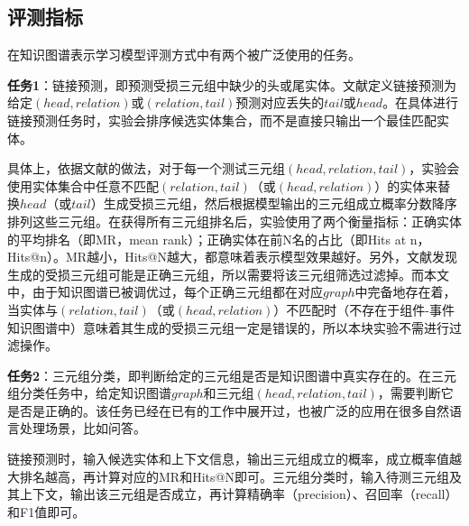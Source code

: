 \subsection{评测指标}
在知识图谱表示学习模型评测方式中有两个被广泛使用的任务。

\textbf{任务1}：链接预测，即预测受损三元组中缺少的头或尾实体。文献\parencite{bordes2011learning,bordes2013translatingE}定义链接预测为给定$(head,relation)$或$(relation,tail)$预测对应丢失的$tail$或$head$。在具体进行链接预测任务时，实验会排序候选实体集合，而不是直接只输出一个最佳匹配实体。

具体上，依据文献\parencite{bordes2013translatingE}的做法，对于每一个测试三元组$(head,relation,tail)$，实验会使用实体集合中任意不匹配$(relation,tail)$（或$(head,relation)$）的实体来替换$head$（或$tail$）生成受损三元组，然后根据模型输出的三元组成立概率分数降序排列这些三元组。在获得所有三元组排名后，实验使用了两个衡量指标：正确实体的平均排名（即MR，mean rank）；正确实体在前N名的占比（即Hits at n，Hits@n）。MR越小，Hits@N越大，都意味着表示模型效果越好。另外，文献\parencite{bordes2013translatingE}发现生成的受损三元组可能是正确三元组，所以需要将该三元组筛选过滤掉。而本文中，由于知识图谱已被调优过，每个正确三元组都在对应$graph$中完备地存在着，当实体与$(relation,tail)$（或$(head,relation)$）不匹配时（不存在于组件-事件知识图谱中）意味着其生成的受损三元组一定是错误的，所以本块实验不需进行过滤操作。

\textbf{任务2}：三元组分类，即判断给定的三元组是否是知识图谱中真实存在的。在三元组分类任务中，给定知识图谱$graph$和三元组$(head,relation,tail)$，需要判断它是否是正确的。该任务已经在已有的工作\parencite{bordes2013translatingE,wang2014knowledge,lin2015learning}中展开过，也被广泛的应用在很多自然语言处理场景，比如问答。

链接预测时，输入候选实体和上下文信息，输出三元组成立的概率，成立概率值越大排名越高，再计算对应的MR和Hits@N即可。三元组分类时，输入待测三元组及其上下文，输出该三元组是否成立，再计算精确率（precision）、召回率（recall）和F1值即可。


